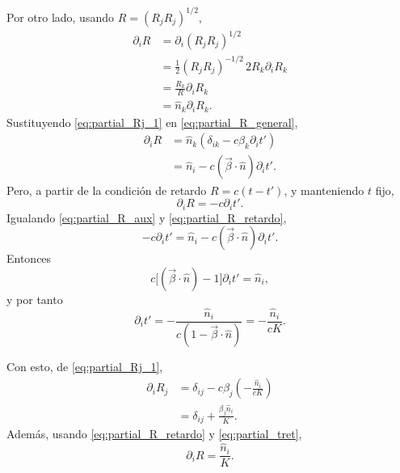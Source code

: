 \documentclass{article}
\numberwithin{equation}{section}
\newcommand{\bv}{\vec{\beta}}
\newcommand{\nh}{\hat{n}}
\newcommand{\K}{K}
\begin{document}
Por otro lado, usando $R=(R_jR_j)^{1/2}$,
\begin{equation}
\begin{aligned}  \partial_i R
  &=\partial_i(R_jR_j)^{1/2} \\
  &=\frac{1}{2}(R_jR_j)^{-1/2}\,2R_k\partial_iR_k \\
  &=\frac{R_k}{R}\partial_iR_k \\
  &=\hat{n}_k\partial_iR_k.
\end{aligned}
  \label{eq:partial_R_general}
\end{equation}
Sustituyendo \eqref{eq:partial_Rj_1} en \eqref{eq:partial_R_general},
\begin{equation}
\begin{aligned}  \partial_iR
  &=\hat{n}_k(\delta_{ik}-c\beta_k\partial_i t') \\
  &=\hat{n}_i-c(\bv\cdot\nh)\partial_i t'.
\end{aligned}
  \label{eq:partial_R_aux}
\end{equation}
Pero, a partir de la condici\'on de retardo $R=c(t-t')$, y manteniendo $t$
fijo,
\begin{equation}
  \partial_iR=-c\partial_i t'.
  \label{eq:partial_R_retardo}
\end{equation}
Igualando \eqref{eq:partial_R_aux} y \eqref{eq:partial_R_retardo},
\begin{equation*}
  -c\partial_i t'
  =\hat{n}_i-c(\bv\cdot\nh)\partial_i t'.
\end{equation*}
Entonces
\begin{equation*}
  c\big[(\bv\cdot\nh)-1\big]\partial_i t'=\hat{n}_i,
\end{equation*}
y por tanto
\begin{equation}
  \boxed{
  \partial_i t'
  =-\frac{\hat{n}_i}{c(1-\bv\cdot\nh)}
  =-\frac{\hat{n}_i}{c\K}.
  }
  \label{eq:partial_tret}
\end{equation}

Con esto, de \eqref{eq:partial_Rj_1},
\begin{equation}
\begin{aligned}  \partial_i R_j
  &=\delta_{ij}-c\beta_j\left(-\frac{\hat{n}_i}{c\K}\right) \\
  &=\boxed{\delta_{ij}+\frac{\beta_j\hat{n}_i}{\K}}.
\end{aligned}
  \label{eq:partial_Rj}
\end{equation}
Adem\'as, usando \eqref{eq:partial_R_retardo} y \eqref{eq:partial_tret},
\begin{equation}
  \boxed{
  \partial_iR=\frac{\hat{n}_i}{\K}.
  }
  \label{eq:partial_R}
\end{equation}
\end{document}
